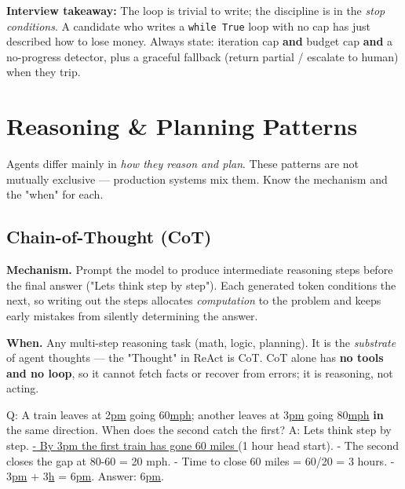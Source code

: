 \documentclass[11pt]{article}
\newenvironment{Shaded}{\begin{snugshade}}{\end{snugshade}}
\newcommand{\DecValTok}[1]{\textcolor[rgb]{0.96,0.45,0.00}{#1}}
\newcommand{\ErrorTok}[1]{\textcolor[rgb]{0.85,0.27,0.33}{\underline{#1}}}
\newcommand{\KeywordTok}[1]{\textcolor[rgb]{0.81,0.81,0.76}{\textbf{#1}}}
\newcommand{\NormalTok}[1]{\textcolor[rgb]{0.81,0.81,0.76}{#1}}
\newcommand{\OperatorTok}[1]{\textcolor[rgb]{0.81,0.81,0.76}{#1}}
\newcommand{\StringTok}[1]{\textcolor[rgb]{0.96,0.31,0.31}{#1}}
\begin{document}
\textbf{Interview takeaway:} The loop is trivial to write; the discipline is in the \emph{stop conditions}. A candidate who writes a \texttt{while\ True} loop with no cap has just described how to lose money. Always state: iteration cap \textbf{and} budget cap \textbf{and} a no-progress detector, plus a graceful fallback (return partial / escalate to human) when they trip.

\section{Reasoning \& Planning Patterns}\label{reasoning--planning-patterns}

Agents differ mainly in \emph{how they reason and plan}. These patterns are not mutually exclusive --- production systems mix them. Know the mechanism and the "when" for each.

\subsection{Chain-of-Thought (CoT)}\label{chain-of-thought-cot}

\textbf{Mechanism.} Prompt the model to produce intermediate reasoning steps before the final answer ("Let\textquotesingle s think step by step"). Each generated token conditions the next, so writing out the steps allocates \emph{computation} to the problem and keeps early mistakes from silently determining the answer.

\textbf{When.} Any multi-step reasoning task (math, logic, planning). It is the \emph{substrate} of agent thoughts --- the "Thought" in ReAct is CoT. CoT alone has \textbf{no tools and no loop}, so it cannot fetch facts or recover from errors; it is reasoning, not acting.


\begin{Shaded}
\begin{Highlighting}[]
\NormalTok{Q: A train leaves at }\DecValTok{2}\ErrorTok{pm}\NormalTok{ going }\DecValTok{60}\ErrorTok{mph}\OperatorTok{;}\NormalTok{ another leaves at }\DecValTok{3}\ErrorTok{pm}\NormalTok{ going }\DecValTok{80}\ErrorTok{mph}
   \KeywordTok{in}\NormalTok{ the same direction. When does the second catch the first?}
\NormalTok{A: Let}\StringTok{\textquotesingle{}s think step by step.}
\ErrorTok{   {-} By 3pm the first train has gone 60 miles }\NormalTok{(}\DecValTok{1}\NormalTok{ hour head start).}
   \OperatorTok{{-}}\NormalTok{ The second closes the gap at }\DecValTok{80}\OperatorTok{{-}}\DecValTok{60} \OperatorTok{=} \DecValTok{20}\NormalTok{ mph.}
   \OperatorTok{{-}}\NormalTok{ Time to close }\DecValTok{60}\NormalTok{ miles }\OperatorTok{=} \DecValTok{60}\OperatorTok{/}\DecValTok{20} \OperatorTok{=} \DecValTok{3}\NormalTok{ hours.}
   \OperatorTok{{-}} \DecValTok{3}\ErrorTok{pm} \OperatorTok{+} \DecValTok{3}\ErrorTok{h} \OperatorTok{=} \DecValTok{6}\ErrorTok{pm}\NormalTok{.}
\NormalTok{   Answer: }\DecValTok{6}\ErrorTok{pm}\NormalTok{.}
\end{Highlighting}
\end{Shaded}
\end{document}

